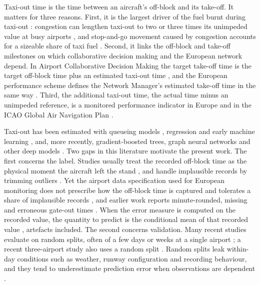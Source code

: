 \documentclass[
  manuscript=article,  %
  layout=preprint,  %
  year=20xx,
  volume=x,
]{extra/joas}
\begin{document}
Taxi-out time is the time between an aircraft's off-block and its take-off. It matters for three reasons. First, it is the largest driver of the fuel burnt during taxi-out \cite{khadilkar2012estimation}: congestion can lengthen taxi-out to two or three times its unimpeded value at busy airports \cite{simaiakis2010impact}, and stop-and-go movement caused by congestion accounts for a sizeable share of taxi fuel \cite{nikoleris2011detailed}. Second, it links the off-block and take-off milestones on which collaborative decision making and the European network depend. In Airport Collaborative Decision Making the target take-off time is the target off-block time plus an estimated taxi-out time \cite{eurocontrol2017airport}, and the European performance scheme defines the Network Manager's estimated take-off time in the same way \cite{europeancommission2019commission}. Third, the additional taxi-out time, the actual time minus an unimpeded reference, is a monitored performance indicator in Europe and in the ICAO Global Air Navigation Plan \cite{europeancommission2019commission,icao2016description,eurocontrol2023additional}.

Taxi-out has been estimated with queueing models \cite{pujet1999inputoutput,idris2002queuing,simaiakis2016queuing}, regression and early machine learning \cite{jordan2010statistical,srivastava2011improving,ravizza2014aircraft,lee2016taxiout,lordan2016forecasting,diana2018can}, and, more recently, gradient-boosted trees, graph neural networks and other deep models \cite{wang2021aircraft,lim2021variable,swatowska2025generalisable,yin2024prediction}. Two gaps in this literature motivate the present work. The first concerns the label. Studies usually treat the recorded off-block time as the physical moment the aircraft left the stand \cite{swatowska2025generalisable,yuan2024additional}, and handle implausible records by trimming outliers \cite{wang2021aircraft,swatowska2025generalisable,yuan2024additional}. Yet the airport data specification used for European monitoring does not prescribe how the off-block time is captured and tolerates a share of implausible records \cite{eurocontrol2019specification}, and earlier work reports minute-rounded, missing and erroneous gate-out times \cite{pujet1999inputoutput,hotle2016using,lee2016taxiout}. When the error measure is computed on the recorded value, the quantity to predict is the conditional mean of that recorded value \cite{gneiting2011making}, artefacts included. The second concerns validation. Many recent studies evaluate on random splits, often of a few days or weeks at a single airport \cite{wu2026interpretable,tang2025road,tran2020taxispeed}; a recent three-airport study also uses a random split \cite{yang2026analysis}. Random splits leak within-day conditions such as weather, runway configuration and recording behaviour, and they tend to underestimate prediction error when observations are dependent \cite{roberts2017cross}.
\end{document}
